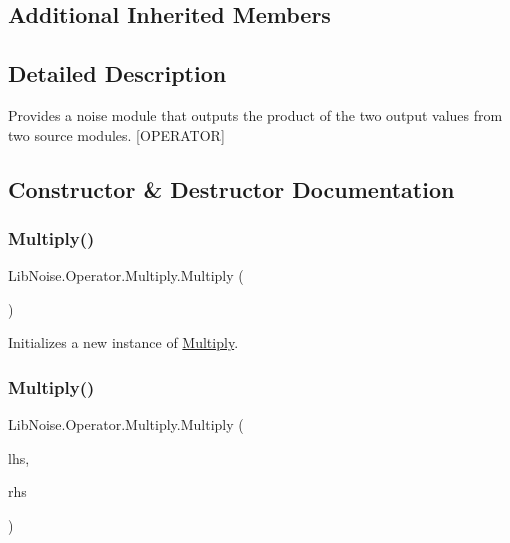 \subsection*{Additional Inherited Members}


\subsection{Detailed Description}
Provides a noise module that outputs the product of the two output values from two source modules. \mbox{[}O\+P\+E\+R\+A\+T\+OR\mbox{]} 



\subsection{Constructor \& Destructor Documentation}
\mbox{\label{class_lib_noise_1_1_operator_1_1_multiply_aac14197bc714aba00fefa50ed89a59d6}} 
\subsubsection{\texorpdfstring{Multiply()}{Multiply()}\hspace{0.1cm}{\footnotesize\ttfamily [1/2]}}
{\footnotesize\ttfamily Lib\+Noise.\+Operator.\+Multiply.\+Multiply (\begin{DoxyParamCaption}{ }\end{DoxyParamCaption})}



Initializes a new instance of \hyperlink{class_lib_noise_1_1_operator_1_1_multiply}{Multiply}. 

\mbox{\label{class_lib_noise_1_1_operator_1_1_multiply_aed0c9e75c0d2852c831d5c3f1753d99f}} 
\subsubsection{\texorpdfstring{Multiply()}{Multiply()}\hspace{0.1cm}{\footnotesize\ttfamily [2/2]}}
{\footnotesize\ttfamily Lib\+Noise.\+Operator.\+Multiply.\+Multiply (\begin{DoxyParamCaption}\item[{\hyperlink{class_lib_noise_1_1_module_base}{Module\+Base}}]{lhs,  }\item[{\hyperlink{class_lib_noise_1_1_module_base}{Module\+Base}}]{rhs }\end{DoxyParamCaption})}



